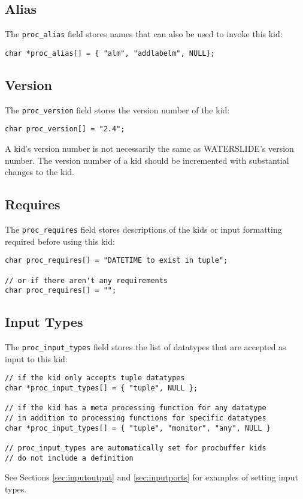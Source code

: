 \documentclass[11pt]{article}
\begin{document}
\subsection{Alias}
The \texttt{proc\_alias} field stores names that can also be used to invoke this kid:
\begin{lstlisting}
char *proc_alias[] = { "alm", "addlabelm", NULL};
\end{lstlisting}

\subsection{Version}
The \texttt{proc\_version} field stores the version number of the kid:
\begin{lstlisting}
char proc_version[] = "2.4";
\end{lstlisting}
A kid's version number is not necessarily the same as WATERSLIDE's version number. The version number of a kid should be
incremented with substantial changes to the kid.

\subsection{Requires}
The \texttt{proc\_requires} field stores descriptions of the kids or input formatting required before using this kid:
\begin{lstlisting}
char proc_requires[] = "DATETIME to exist in tuple";

// or if there aren't any requirements
char proc_requires[] = "";
\end{lstlisting}

\subsection{Input Types}
The \texttt{proc\_input\_types} field stores the list of datatypes that are accepted as input to this kid:
\begin{lstlisting}
// if the kid only accepts tuple datatypes
char *proc_input_types[] = { "tuple", NULL };

// if the kid has a meta processing function for any datatype
// in addition to processing functions for specific datatypes
char *proc_input_types[] = { "tuple", "monitor", "any", NULL }

// proc_input_types are automatically set for procbuffer kids
// do not include a definition
\end{lstlisting}
See Sections \ref{sec:inputoutput} and \ref{sec:inputports} for examples of setting input types.
\end{document}
